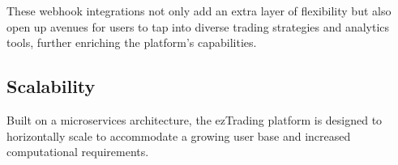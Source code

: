 These webhook integrations not only add an extra layer of flexibility but also open up avenues for users to tap into diverse trading strategies and analytics tools, further enriching the platform's capabilities.


\subsection{Scalability}
Built on a microservices architecture, the ezTrading platform is designed to horizontally scale to accommodate a growing user base and increased computational requirements.
